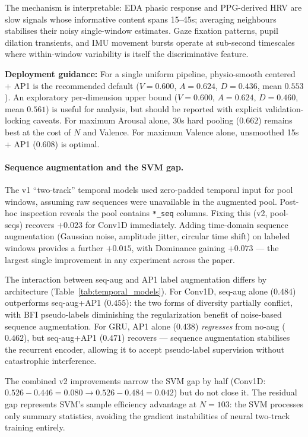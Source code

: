 \documentclass[sigconf,nonacm]{acmart}
\begin{document}
The mechanism is interpretable: EDA phasic response and PPG-derived HRV are
slow signals whose informative content spans 15--45s; averaging neighbours
stabilises their noisy single-window estimates.
Gaze fixation patterns, pupil dilation transients, and IMU movement bursts
operate at sub-second timescales where within-window variability is itself
the discriminative feature.

\textbf{Deployment guidance:} For a single uniform pipeline,
physio-smooth centered + AP1 is the recommended default
($V{=}0.600$, $A{=}0.624$, $D{=}0.436$, mean $0.553$).
An exploratory per-dimension upper bound
($V{=}0.600$, $A{=}0.624$, $D{=}0.460$, mean $0.561$) is useful for
analysis, but should be reported with explicit validation-locking caveats.
For maximum Arousal alone, 30s hard pooling ($0.662$) remains best at the cost
of $N$ and Valence.
For maximum Valence alone, unsmoothed 15s + AP1 ($0.608$) is optimal.

\paragraph{Sequence augmentation and the SVM gap.}
The v1 ``two-track'' temporal models used zero-padded temporal input for pool
windows, assuming raw sequences were unavailable in the augmented pool.
Post-hoc inspection reveals the pool contains \texttt{*\_seq} columns.
Fixing this (v2, pool-seqs) recovers $+0.023$ for Conv1D immediately.
Adding time-domain sequence augmentation (Gaussian noise, amplitude jitter,
circular time shift) on labeled windows provides a further $+0.015$, with
Dominance gaining $+0.073$ --- the largest single improvement in any
experiment across the paper.

The interaction between seq-aug and AP1 label augmentation differs by
architecture (Table~\ref{tab:temporal_models}).
For Conv1D, seq-aug alone ($0.484$) outperforms seq-aug+AP1 ($0.455$):
the two forms of diversity partially conflict, with BFI pseudo-labels
diminishing the regularization benefit of noise-based sequence augmentation.
For GRU, AP1 alone ($0.438$) \emph{regresses} from no-aug ($0.462$), but
seq-aug+AP1 ($0.471$) recovers --- sequence augmentation stabilises the
recurrent encoder, allowing it to accept pseudo-label supervision without
catastrophic interference.

The combined v2 improvements narrow the SVM gap by half
(Conv1D: $0.526{-}0.446{=}0.080 \rightarrow 0.526{-}0.484{=}0.042$)
but do not close it.
The residual gap represents SVM's sample efficiency advantage at $N{=}103$:
the SVM processes only summary statistics, avoiding the gradient instabilities
of neural two-track training entirely.
\end{document}
